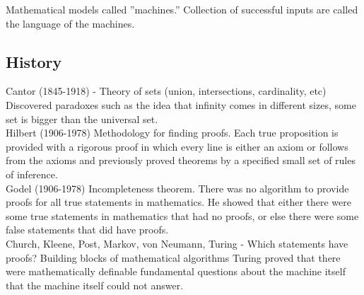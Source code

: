 Mathematical models called ''machines.''
Collection of successful inputs are called the language of the machines.

\subsection{History}
Cantor (1845-1918) - Theory of sets (union, intersections, cardinality, etc) Discovered paradoxes such as the idea that infinity comes in different sizes, some set is bigger than the universal set.\\
Hilbert (1906-1978) Methodology for finding proofs. Each true proposition is provided with a rigorous proof in which every line is either an axiom or follows from the axioms and previously proved theorems by a specified small set of rules of inference.\\
Godel (1906-1978) Incompleteness theorem. There was no algorithm to provide proofs for all true statements in mathematics. He showed that either there were some true statements in mathematics that had no proofs, or else there were some false statements that did have proofs.\\
    Church, Kleene, Post, Markov, von Neumann, Turing - Which statements have proofs? Building blocks of mathematical algorithms
Turing proved that there were mathematically definable fundamental questions about the machine itself that the machine itself could not answer.

